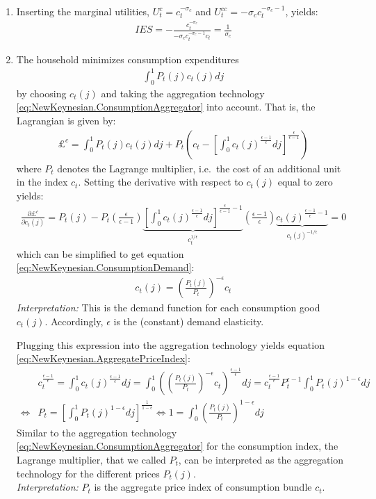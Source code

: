 \begin{enumerate}

\item Inserting the marginal utilities, $U_t^{c} = c_t^{-\sigma_c}$ and $U_t^{cc} = -\sigma_c c_t^{-\sigma_c-1}$, yields:
\begin{align*}
IES = -\frac{c_t^{-\sigma_c}}{ -\sigma_c c_t^{-\sigma_c-1} c_t} = \frac{1}{\sigma_c}
\end{align*}

\item The household minimizes consumption expenditures
\begin{align*}
\int_0^1 P_t(j) c_t(j)dj
\end{align*}
by choosing $c_t(j)$ and taking the aggregation technology \eqref{eq:NewKeynesian.ConsumptionAggregator} into account.
That is, the Lagrangian is given by:
\begin{align*}
\pounds^c = \int_0^1 P_t(j) c_t(j)dj + P_t \left( c_t - \left[\int_0^1 c_t(j)^{\frac{\epsilon-1}{\epsilon}}dj\right]^{\frac{\epsilon}{\epsilon-1}} \right)
\end{align*}
  where $P_t$ denotes the Lagrange multiplier, i.e.\ the cost of an additional unit in the index $c_t$.
Setting the derivative with respect to $c_t(j)$ equal to zero yields:
\begin{align*}
\frac{\partial \pounds^c}{\partial c_t(j)} = P_t(j) - P_t \left(\frac{\epsilon}{\epsilon-1}\right) \underbrace{\left[\int_0^1 c_t(j)^{\frac{\epsilon-1}{\epsilon}}dj\right]^{\frac{\epsilon}{\epsilon-1}-1}}_{c_t^{1/\epsilon}} \left(\frac{\epsilon-1}{\epsilon}\right) \underbrace{c_t(j)^{\frac{\epsilon-1}{\epsilon}-1}}_{c_t(j)^{-1/\epsilon}} = 0
\end{align*}
which can be simplified to get equation \eqref{eq:NewKeynesian.ConsumptionDemand}:
\begin{align*}
c_t(j) = \left(\frac{P_t(j)}{P_t}\right)^{-\epsilon} c_t
\end{align*}
\emph{Interpretation:} This is the demand function for each consumption good $c_t(j)$.
Accordingly, $\epsilon$ is the (constant) demand elasticity.
	
Plugging this expression into the aggregation technology yields equation \eqref{eq:NewKeynesian.AggregatePriceIndex}:
\begin{align*}
&c_t^{\frac{\epsilon-1}{\epsilon}} = \int_0^1 c_t(j)^{\frac{\epsilon-1}{\epsilon}}dj = \int_0^1 \left(\left(\frac{P_t(j)}{P_t}\right)^{-\epsilon} c_t\right)^{\frac{\epsilon-1}{\epsilon}}dj = c_t^{\frac{\epsilon-1}{\epsilon}} P_t^{\epsilon-1} \int_0^1 P_t(j)^{1-\epsilon}dj
\\
\Leftrightarrow &
P_t = \left[\int_0^1 P_t(j)^{1-\epsilon}dj\right]^{\frac{1}{1-\epsilon}}
\Leftrightarrow
1 = \int_0^1 \left(\frac{P_t(j)}{P_t}\right)^{1-\epsilon}dj
\end{align*}
Similar to the aggregation technology \eqref{eq:NewKeynesian.ConsumptionAggregator} for the consumption index,
  the Lagrange multiplier, that we called $P_t$, can be interpreted as the aggregation technology for the different prices $P_t(j)$.
\\\emph{Interpretation:} $P_t$ is the aggregate price index of consumption bundle $c_t$.


\end{enumerate}
